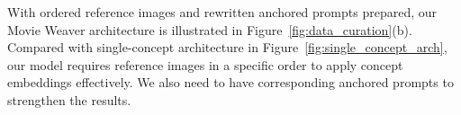 With ordered reference images and rewritten anchored prompts prepared, our Movie Weaver architecture is illustrated in Figure~\ref{fig:data_curation}(b). 
Compared with single-concept architecture in Figure~\ref{fig:single_concept_arch}, our model requires reference images in a specific order to apply concept embeddings effectively. We also need to have corresponding anchored prompts to strengthen the results.
